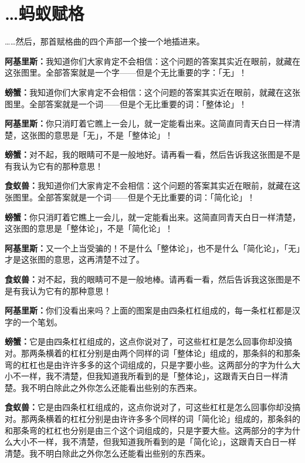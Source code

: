 \documentclass[
  12pt,
  twoside,
  openright,
  oldfontcommands,
]{memoir}
\newcommand{\dialogname}[1]{{\heifamily\bfseries #1}}
\begin{document}
\mainmatter
\setcounter{chapter}{10}
\markboth{}{}

\chapter*{\ldots 蚂蚁赋格}

\ldots\ldots 然后，那首赋格曲的四个声部一个接一个地插进来。

\dialogname{阿基里斯：}我知道你们大家肯定不会相信：这个问题的答案其实近在眼前，就藏在这张图里。全部答案就是一个字------但是个无比重要的字：「无」！

\dialogname{螃蟹：}我知道你们大家肯定不会相信：这个问题的答案其实近在眼前，就藏在这张图里。全部答案就是一个词------但是个无比重要的词：「整体论」！

\dialogname{阿基里斯：}你只消盯着它瞧上一会儿，就一定能看出来。这简直同青天白日一样清楚，这张图的意思是「无」，不是「整体论」！

\dialogname{螃蟹：}对不起，我的眼睛可不是一般地好。请再看一看，然后告诉我这张图是不是有我认为它有的那种意思！

\dialogname{食蚁兽：}我知道你们大家肯定不会相信：这个问题的答案其实近在眼前，就藏在这张图里。全部答案就是一个词------但是个无比重要的词：「简化论」！

\dialogname{螃蟹：}你只消盯着它瞧上一会儿，就一定能看出来。这简直同青天白日一样清楚，这张图的意思是「整体论」，不是「简化论」！

\dialogname{阿基里斯：}又一个上当受骗的！不是什么「整体论」，也不是什么「简化论」，「无」才是这张图的意思，这再清楚不过了。

\dialogname{食蚁兽：}对不起，我的眼睛可不是一般地棒。请再看一看，然后告诉我这张图是不是有我认为它有的那种意思！

\dialogname{阿基里斯：}你们没看出来吗？上面的图案是由四条杠杠组成的，每一条杠杠都是汉字的一个笔划。

\dialogname{螃蟹：}它是由四条杠杠组成的，这点你说对了，可这些杠杠是怎么回事你却没搞对。那两条横着的杠杠分别是由两个同样的词「整体论」组成的，那条斜的和那条弯的杠杠也是由许许多多的这个词组成的，只是字要小些。这两部分的字为什么大小不一样，我不清楚，但我知道我所看到的是「整体论」，这跟青天白日一样清楚。我不明白除此之外你怎么还能看出些别的东西来。

\dialogname{食蚁兽：}它是由四条杠杠组成的，这点你说对了，可这些杠杠是怎么回事你却没搞对。那两条横着的杠杠分别是由许许多多个同样的词「简化论」组成的，那条斜的和那条弯的杠杠也分别是由三个这个词组成的，只是字要大些。这两部分的字为什么大小不一样，我不清楚，但我知道我所看到的是「简化论」，这跟青天白日一样清楚。我不明白除此之外你怎么还能看出些别的东西来。
\end{document}

